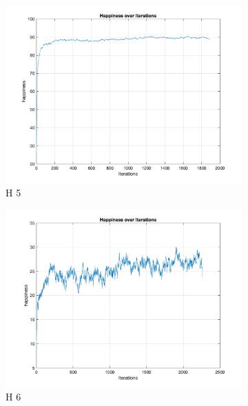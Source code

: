 \documentclass[unicode,11pt,a4paper,oneside,numbers=endperiod,openany]{scrartcl}
\begin{document}
\begin{figure}[H]
\begin{subfigure}[b]{0.45\textwidth}
        \includegraphics[width=\textwidth]{Convergence/ConvergenceH5Random_1.png}
        \caption{H 5}
        \label{fig:image14}
      \end{subfigure}
      \begin{subfigure}[b]{0.45\textwidth}
        
        \includegraphics[width=\textwidth]{Convergence/ConvergenceH6Random_1.png}
        \caption{H 6}
        \label{fig:image15}
      \end{subfigure}
      
      \begin{subfigure}[b]{0.45\textwidth}
        

\end{subfigure}
\end{figure}
\end{document}
